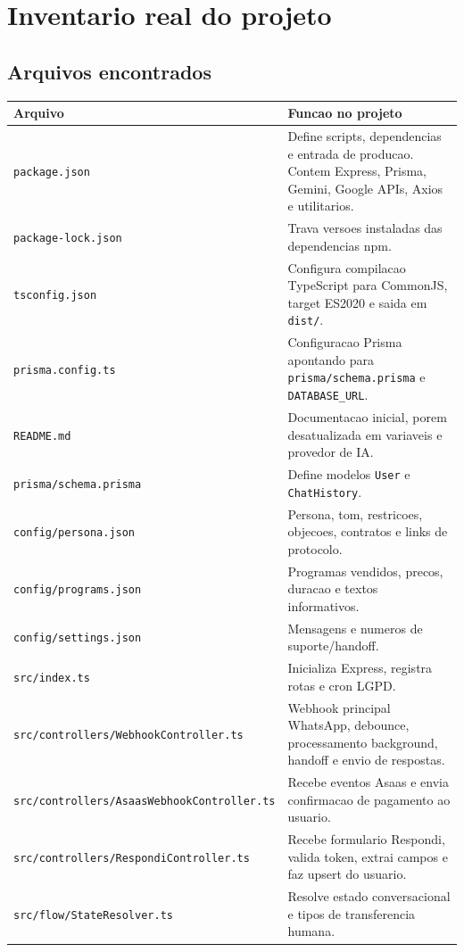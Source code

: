 \documentclass[11pt,a4paper]{article}
\begin{document}
\section{Inventario real do projeto}

\subsection{Arquivos encontrados}

\begin{longtable}{p{}p{}}
\toprule
\textbf{Arquivo} & \textbf{Funcao no projeto} \\
\midrule
\texttt{package.json} & Define scripts, dependencias e entrada de producao. Contem Express, Prisma, Gemini, Google APIs, Axios e utilitarios. \\
\texttt{package-lock.json} & Trava versoes instaladas das dependencias npm. \\
\texttt{tsconfig.json} & Configura compilacao TypeScript para CommonJS, target ES2020 e saida em \texttt{dist/}. \\
\texttt{prisma.config.ts} & Configuracao Prisma apontando para \texttt{prisma/schema.prisma} e \texttt{DATABASE\_URL}. \\
\texttt{README.md} & Documentacao inicial, porem desatualizada em variaveis e provedor de IA. \\
\texttt{prisma/schema.prisma} & Define modelos \texttt{User} e \texttt{ChatHistory}. \\
\texttt{config/persona.json} & Persona, tom, restricoes, objecoes, contratos e links de protocolo. \\
\texttt{config/programs.json} & Programas vendidos, precos, duracao e textos informativos. \\
\texttt{config/settings.json} & Mensagens e numeros de suporte/handoff. \\
\texttt{src/index.ts} & Inicializa Express, registra rotas e cron LGPD. \\
\texttt{src/controllers/WebhookController.ts} & Webhook principal WhatsApp, debounce, processamento background, handoff e envio de respostas. \\
\texttt{src/controllers/AsaasWebhookController.ts} & Recebe eventos Asaas e envia confirmacao de pagamento ao usuario. \\
\texttt{src/controllers/RespondiController.ts} & Recebe formulario Respondi, valida token, extrai campos e faz upsert do usuario. \\
\texttt{src/flow/StateResolver.ts} & Resolve estado conversacional e tipos de transferencia humana. \\

\end{longtable}
\end{document}
